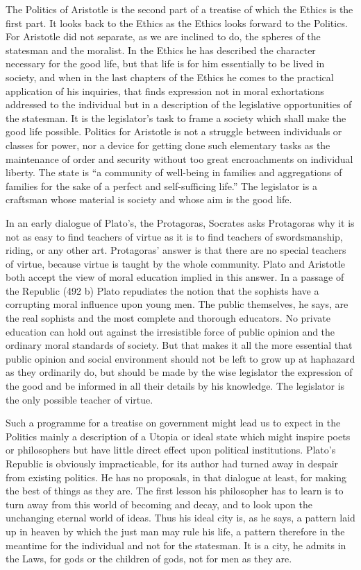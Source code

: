 
The Politics of Aristotle is the second part of a treatise of which the
Ethics is the first part. It looks back to the Ethics as the Ethics looks
forward to the Politics. For Aristotle did not separate, as we are
inclined to do, the spheres of the statesman and the moralist. In the
Ethics he has described the character necessary for the good life, but
that life is for him essentially to be lived in society, and when in the
last chapters of the Ethics he comes to the practical application of his
inquiries, that finds expression not in moral exhortations addressed to
the individual but in a description of the legislative opportunities of
the statesman. It is the legislator's task to frame a society which shall
make the good life possible. Politics for Aristotle is not a struggle
between individuals or classes for power, nor a device for getting done
such elementary tasks as the maintenance of order and security without too
great encroachments on individual liberty. The state is ``a community of
well-being in families and aggregations of families for the sake of a
perfect and self-sufficing life.'' The legislator is a craftsman whose
material is society and whose aim is the good life.

In an early dialogue of Plato's, the Protagoras, Socrates asks Protagoras
why it is not as easy to find teachers of virtue as it is to find teachers
of swordsmanship, riding, or any other art. Protagoras' answer is that
there are no special teachers of virtue, because virtue is taught by the
whole community. Plato and Aristotle both accept the view of moral
education implied in this answer. In a passage of the Republic (492 b)
Plato repudiates the notion that the sophists have a corrupting moral
influence upon young men. The public themselves, he says, are the real
sophists and the most complete and thorough educators. No private
education can hold out against the irresistible force of public opinion
and the ordinary moral standards of society. But that makes it all the
more essential that public opinion and social environment should not be
left to grow up at haphazard as they ordinarily do, but should be made by
the wise legislator the expression of the good and be informed in all
their details by his knowledge. The legislator is the only possible
teacher of virtue.

Such a programme for a treatise on government might lead us to expect in
the Politics mainly a description of a Utopia or ideal state which might
inspire poets or philosophers but have little direct effect upon political
institutions. Plato's Republic is obviously impracticable, for its author
had turned away in despair from existing politics. He has no proposals, in
that dialogue at least, for making the best of things as they are. The
first lesson his philosopher has to learn is to turn away from this world
of becoming and decay, and to look upon the unchanging eternal world of
ideas. Thus his ideal city is, as he says, a pattern laid up in heaven by
which the just man may rule his life, a pattern therefore in the meantime
for the individual and not for the statesman. It is a city, he admits in
the Laws, for gods or the children of gods, not for men as they are.

